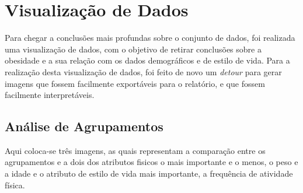 \documentclass{easychair}
\begin{document}
\section{Visualização de Dados}

Para chegar a conclusões mais profundas sobre o conjunto de dados, foi realizada uma visualização de dados, com o objetivo de retirar conclusões sobre a obesidade e a sua relação com os dados demográficos e de estilo de vida. Para a realização desta visualização de dados, foi feito de novo um \textit{detour} para gerar imagens que fossem facilmente exportáveis para o relatório, e que fossem facilmente interpretáveis.

\subsection{Análise de Agrupamentos}

Aqui coloca-se três imagens, as quais representam a comparação entre os agrupamentos e a dois dos atributos fisicos o mais importante e o menos, o peso e a idade e o atributo de estilo de vida mais importante, a frequência de atividade física.
\end{document}
